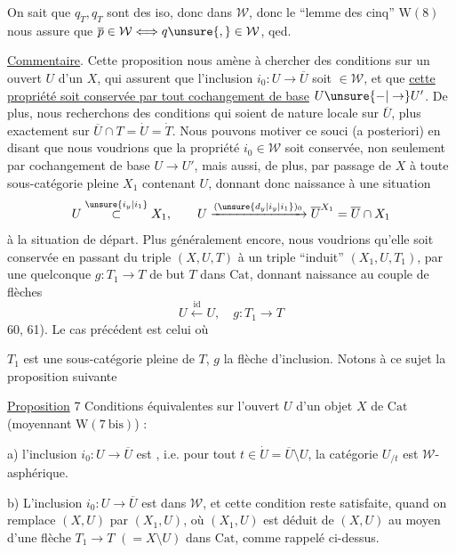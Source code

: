 
On sait que $q_{\dot T},q_T$ sont des iso, donc dans $\mathcal W$,
donc le ``lemme des cinq'' $\mathrm W(8)$ nous assure que
$\overline p\in\mathcal W\Longleftrightarrow q\unsure{,}\in\mathcal W$, qed.

\uline{Commentaire}. Cette proposition nous amène à
chercher des conditions sur un ouvert $U$ d'un
$X$, qui assurent que l'inclusion $i_0:U\to\overline U$
soit $\in\mathcal W$, et que \uline{cette propriété soit conservée
par tout cochangement de base} $U\unsure{-|\to}U'$. De
plus, nous recherchons des conditions qui soient
de nature locale sur $\overline U$, plus exactement sur
$\overline U\cap T=\dot U=\dot T$. Nous pouvons motiver ce
souci (a posteriori) en disant que nous
voudrions que la propriété $i_0\in\mathcal W$ soit conservée, non seulement par cochangement de base
 $U\to U'$, mais aussi, de plus, par
passage de $X$ à toute sous-catégorie pleine
$X_1$ contenant $U$, donnant donc naissance
à une situation
\[
 U\overset{\unsure{i_y|i_1}}{\subset} X_1,\qquad
 U\xrightarrow{(\unsure{d_y|i_y|i_1})_0}\overline U^{X_1}=\overline U\cap X_1
\]
 à la situation de départ. Plus
généralement encore, nous voudrions qu'elle
soit conservée en passant du 
triple $(X,U,T)$ à un triple ``induit'' $(X_1,U,T_1)$,
par  une  quelconque $g:T_1\to T$ de
but $T$ dans $\mathrm{Cat}$, donnant naissance au
couple de flèches
\[
 U\xleftarrow{\mathrm{id}}U,\quad g:T_1\to T
\]
 60, 61). Le cas précédent est celui où


$T_1$ est une sous-catégorie pleine de $T$, $g$ la flèche
d'inclusion. Notons à ce sujet la proposition
suivante

\uline{Proposition} 7 Conditions équivalentes sur l'ouvert
$U$ d'un objet $X$ de $\mathrm{Cat}$ (moyennant $\mathrm W(7\ \mathrm{bis})$) :

a) l'inclusion $i_0:U\to\overline U$ est ,
 i.e. pour tout $t\in\dot U=\overline U\setminus U$, la catégorie
$U_{/t}$ est $\mathcal W$-asphérique.

b) L'inclusion $i_0:U\to\overline U$ est dans $\mathcal W$, et cette
condition reste satisfaite, quand on remplace
$(X,U)$ par $(X_1,U)$, où $(X_1,U)$ est déduit de
$(X,U)$ au moyen d'une flèche $T_1\to T$ $(=X\setminus U)$
dans $\mathrm{Cat}$, comme rappelé ci-dessus.


